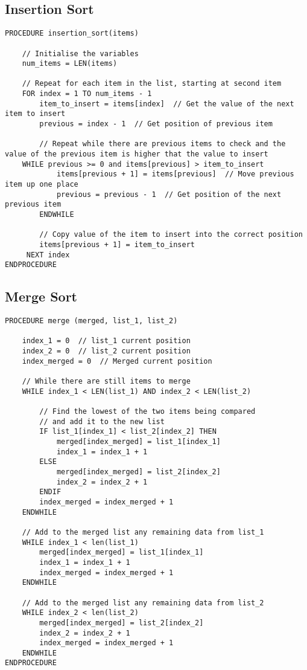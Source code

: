 \documentclass[a4paper,11pt]{article}
\begin{document}
\subsection{Insertion Sort}
\begin{Verbatim}[breaklines=true, breakanywhere=true]
PROCEDURE insertion_sort(items)
    
    // Initialise the variables
    num_items = LEN(items)

    // Repeat for each item in the list, starting at second item
    FOR index = 1 TO num_items - 1        
        item_to_insert = items[index]  // Get the value of the next item to insert
        previous = index - 1  // Get position of previous item       

        // Repeat while there are previous items to check and the value of the previous item is higher that the value to insert
	WHILE previous >= 0 and items[previous] > item_to_insert      
            items[previous + 1] = items[previous]  // Move previous item up one place
            previous = previous - 1  // Get position of the next previous item
        ENDWHILE

        // Copy value of the item to insert into the correct position
        items[previous + 1] = item_to_insert  
     NEXT index    
ENDPROCEDURE
\end{Verbatim}
\subsection{Merge Sort}
\begin{Verbatim}[breaklines=true, breakanywhere=true]
PROCEDURE merge (merged, list_1, list_2)

    index_1 = 0  // list_1 current position
    index_2 = 0  // list_2 current position
    index_merged = 0  // Merged current position

    // While there are still items to merge        
    WHILE index_1 < LEN(list_1) AND index_2 < LEN(list_2)
        
        // Find the lowest of the two items being compared 
        // and add it to the new list
        IF list_1[index_1] < list_2[index_2] THEN
            merged[index_merged] = list_1[index_1]
            index_1 = index_1 + 1
        ELSE
            merged[index_merged] = list_2[index_2]
            index_2 = index_2 + 1
        ENDIF 
        index_merged = index_merged + 1
    ENDWHILE 

    // Add to the merged list any remaining data from list_1
    WHILE index_1 < len(list_1)
        merged[index_merged] = list_1[index_1] 
        index_1 = index_1 + 1
        index_merged = index_merged + 1
    ENDWHILE
        
    // Add to the merged list any remaining data from list_2
    WHILE index_2 < len(list_2)
        merged[index_merged] = list_2[index_2]
        index_2 = index_2 + 1
        index_merged = index_merged + 1
    ENDWHILE
ENDPROCEDURE
\end{Verbatim}
\end{document}
